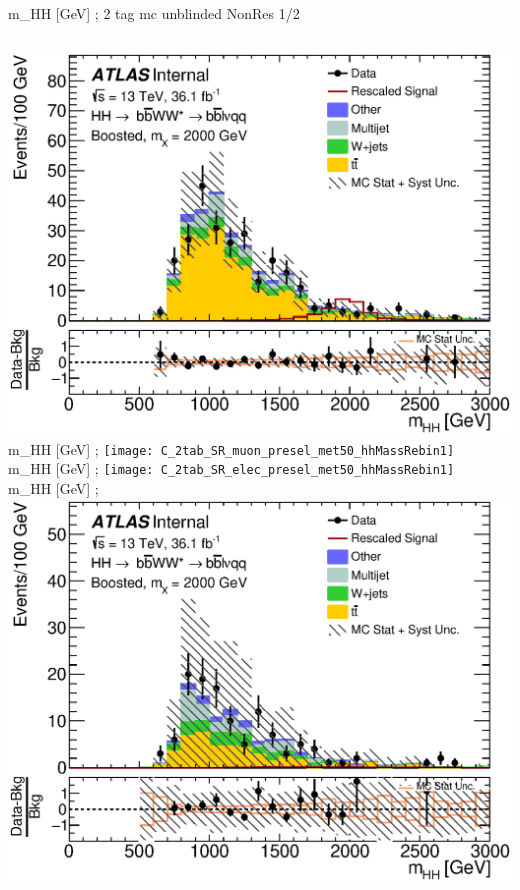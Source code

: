 \begin{frame}{m\_{HH} [GeV]  ; 2 tag mc unblinded NonRes 1/2}
  \begin{columns}[c]
    \centering\includegraphics[width=\textwidth]{C_2tab_SR_lepton_presel_met50_hhMassRebin1}\\
    m\_{HH} [GeV]  ; 
    \centering\texttt{[image: C\_2tab\_SR\_muon\_presel\_met50\_hhMassRebin1]}\\
    m\_{HH} [GeV]  ; 
    \centering\texttt{[image: C\_2tab\_SR\_elec\_presel\_met50\_hhMassRebin1]}\\
    m\_{HH} [GeV]  ; 
    \centering\includegraphics[width=\textwidth]{C_2tag_mbbcrLow_elec_presel_met50_hhMassRebin1}\\

\end{columns}
\end{frame}
